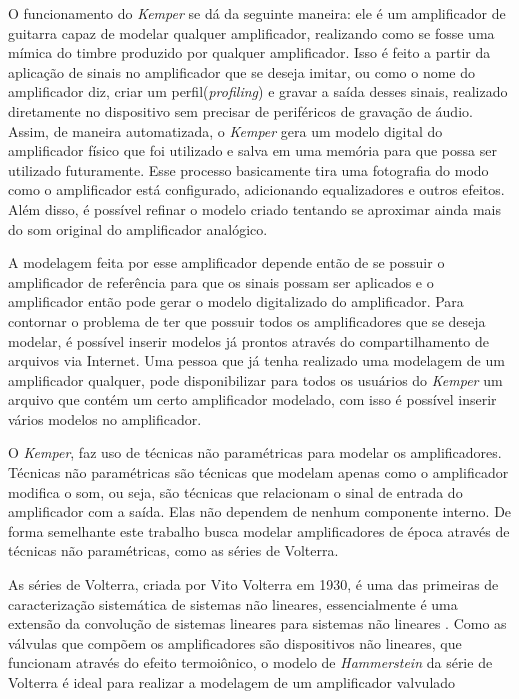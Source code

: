 O funcionamento do \textit{Kemper} se dá da seguinte maneira: ele é um amplificador de guitarra capaz de modelar qualquer amplificador, realizando como se fosse uma mímica do timbre produzido por qualquer amplificador. Isso é feito a partir da aplicação de sinais no amplificador que se deseja imitar, ou como o nome do amplificador diz, criar um perfil(\textit{profiling}) e gravar a saída desses sinais, realizado diretamente no dispositivo sem precisar de periféricos de gravação de áudio. Assim, de maneira automatizada, o \textit{Kemper} gera um modelo digital do amplificador físico que foi utilizado e salva em uma memória para que possa ser utilizado futuramente. Esse processo basicamente tira uma fotografia do modo como o amplificador está configurado, adicionando equalizadores e outros efeitos. Além disso, é possível refinar o modelo criado tentando se aproximar ainda mais do som original do amplificador analógico.

A modelagem feita por esse amplificador depende então de se possuir o amplificador de referência para que os sinais possam ser aplicados e o amplificador então pode gerar o modelo digitalizado do amplificador. Para contornar o problema de ter que possuir todos os amplificadores que se deseja modelar, é possível inserir modelos já prontos através do compartilhamento de arquivos via Internet. Uma pessoa que já tenha realizado uma modelagem de um amplificador qualquer, pode disponibilizar para todos os usuários do \textit{Kemper} um arquivo que contém um certo amplificador modelado, com isso é possível inserir vários modelos no amplificador.

O \textit{Kemper}, faz uso de técnicas não paramétricas para modelar os amplificadores. Técnicas não paramétricas são técnicas que modelam apenas como o amplificador modifica o som, ou seja, são técnicas que relacionam o sinal de entrada do amplificador com a saída. Elas não dependem de nenhum componente interno. De forma semelhante este trabalho busca modelar amplificadores de época através de técnicas não paramétricas, como as séries de Volterra.

As séries de Volterra, criada por Vito Volterra em 1930, é uma das primeiras de caracterização sistemática de sistemas não lineares, essencialmente é uma extensão da convolução de sistemas lineares para sistemas não lineares \cite{cheng2017volterra}. Como as válvulas que compõem os amplificadores são dispositivos não lineares, que funcionam através do efeito termoiônico, o modelo de \textit{Hammerstein} da série de Volterra é ideal para realizar a modelagem de um amplificador valvulado






